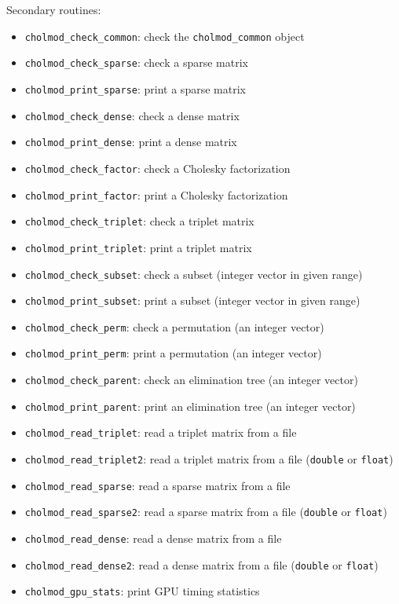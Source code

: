 \documentclass[11pt]{article}
\begin{document}
\vspace{0.1in}
\noindent Secondary routines:
    \begin{itemize}
    \item {\tt cholmod\_check\_common}: check the {\tt cholmod\_common} object
    \item {\tt cholmod\_check\_sparse}: check a sparse matrix
    \item {\tt cholmod\_print\_sparse}: print a sparse matrix
    \item {\tt cholmod\_check\_dense}: check a dense matrix
    \item {\tt cholmod\_print\_dense}: print a dense matrix
    \item {\tt cholmod\_check\_factor}: check a Cholesky factorization
    \item {\tt cholmod\_print\_factor}: print a Cholesky factorization
    \item {\tt cholmod\_check\_triplet}: check a triplet matrix
    \item {\tt cholmod\_print\_triplet}: print a triplet matrix
    \item {\tt cholmod\_check\_subset}: check a subset (integer vector in given
    range)
    \item {\tt cholmod\_print\_subset}: print a subset (integer vector in given
    range)
    \item {\tt cholmod\_check\_perm}: check a permutation (an integer vector)
    \item {\tt cholmod\_print\_perm}: print a permutation (an integer vector)
    \item {\tt cholmod\_check\_parent}: check an elimination tree (an integer
    vector)
    \item {\tt cholmod\_print\_parent}: print an elimination tree (an integer
    vector)
    \item {\tt cholmod\_read\_triplet}: read a triplet matrix from a file
    \item {\tt cholmod\_read\_triplet2}: read a triplet matrix from a file
        ({\tt double} or {\tt float})
    \item {\tt cholmod\_read\_sparse}: read a sparse matrix from a file
    \item {\tt cholmod\_read\_sparse2}: read a sparse matrix from a file
        ({\tt double} or {\tt float})
    \item {\tt cholmod\_read\_dense}: read a dense matrix from a file
    \item {\tt cholmod\_read\_dense2}: read a dense matrix from a file
        ({\tt double} or {\tt float})
    \item {\tt cholmod\_gpu\_stats}: print GPU timing statistics
    \end{itemize}
\end{document}
